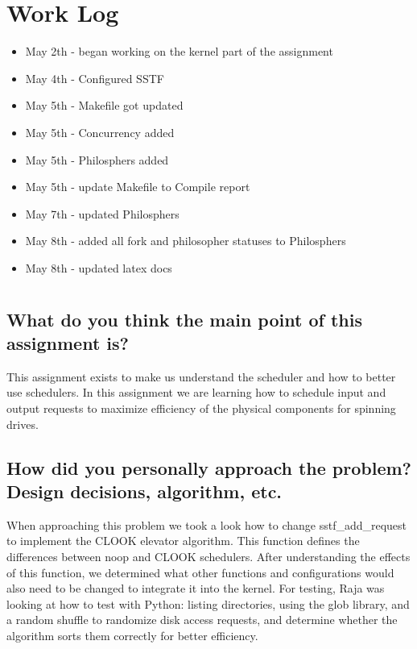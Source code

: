 \documentclass[draftclsnofoot,onecolumn,10pt,compsoc]{IEEEtran}
\begin{document}
\section{Work Log}
\begin{itemize}
	\item May 2th - began working on the kernel part of the assignment
	\item May 4th - Configured SSTF
	\item May 5th - Makefile got updated
	\item May 5th -  Concurrency added
	\item May 5th - Philosphers added
	\item May 5th - update Makefile to Compile report
	\item May 7th - updated Philosphers 
	\item May 8th - added all fork and philosopher statuses to Philosphers
	\item May 8th - updated latex docs
	
	
	
	
	
\end{itemize}
\section{}
\subsection{What do you think the main point of this assignment is?}
This assignment exists to make us understand the scheduler and how to better use schedulers. In this assignment we are learning how to schedule input and output requests to maximize efficiency of the physical components for spinning drives.
\subsection{How did you personally approach the problem? Design decisions, algorithm, etc.}
When approaching this problem we took a look how to change sstf\_add\_request to implement the CLOOK elevator algorithm. This function defines the differences between noop and CLOOK schedulers. After understanding the effects of this function, we determined what other functions and configurations would also need to be changed to integrate it into the kernel. For testing, Raja was looking at how to test with Python: listing directories, using the glob library, and a random shuffle to randomize disk access requests, and determine whether the algorithm sorts them correctly for better efficiency.
\end{document}
